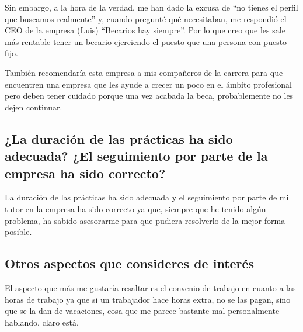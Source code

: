 \documentclass[12pt,letterpaper]{article}
\begin{document}
Sin embargo, a la hora de la verdad, me han dado la excusa de ``no tienes el perfil que buscamos realmente'' y, cuando pregunté qué necesitaban, me respondió el CEO de la empresa (Luis) ``Becarios hay siempre''. Por lo que creo que les sale más rentable tener un becario ejerciendo el puesto que una persona con puesto fijo.

También recomendaría esta empresa a mis compañeros de la carrera para que encuentren una empresa que les ayude a crecer un poco en el ámbito profesional pero deben tener cuidado porque una vez acabada la beca, probablemente no les dejen continuar.

\subsection{¿La duración de las prácticas ha sido adecuada? ¿El seguimiento por parte de la empresa ha sido correcto?}
La duración de las prácticas ha sido adecuada y el seguimiento por parte de mi tutor en la empresa ha sido correcto ya que, siempre que he tenido algún problema, ha sabido asesorarme para que pudiera resolverlo de la mejor forma posible.

\subsection{Otros aspectos que consideres de interés}
El aspecto que más me gustaría resaltar es el convenio de trabajo en cuanto a las horas de trabajo ya que si un trabajador hace horas extra, no se las pagan, sino que se la dan de vacaciones, cosa que me parece bastante mal personalmente hablando, claro está.
\end{document}
